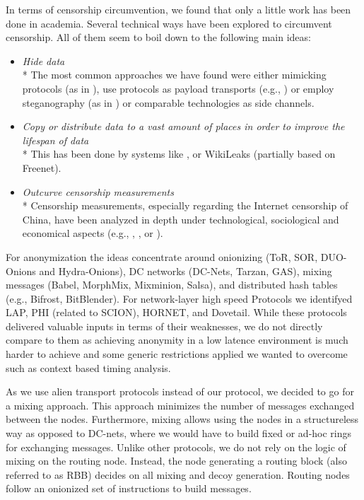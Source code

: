 \documentclass[acmsmall, screen, final]{acmart}
\begin{document}
	In terms of censorship circumvention, we found that only a little work has been done in academia. Several technical ways have been explored to circumvent censorship. All of them seem to boil down to the following main ideas:
	\begin{itemize}
		\item \emph{Hide data}\\*
		The most common approaches we have found were either mimicking protocols (as in \cite{mohajeri2013skypemorph}), use protocols as payload transports (e.g., \cite{AthanRAM07}) or employ steganography (as in \cite{f5}) or comparable technologies as side channels.
		\item \emph{Copy or distribute data to a vast amount of places in order to improve the lifespan of data}\\*
		This has been done by systems like \cite{freenet}, or WikiLeaks (partially based on Freenet).
		\item \emph{Outcurve censorship measurements}\\*
		Censorship measurements, especially regarding the Internet censorship of China, have been analyzed in depth under technological, sociological and economical aspects (e.g., \cite{Ensafi:2015}, \cite{Clayton:2006}, or \cite{lowe2007great}).
	\end{itemize}
	
	For anonymization the ideas concentrate around onionizing (ToR\cite{tor-spec}, SOR\cite{Egners_2012}, DUO-Onions and Hydra-Onions\cite{iwanik2005duo}), DC networks (DC-Nets\cite{chaum-dc}, Tarzan\cite{tarzan:ccs02}, GAS\cite{AthanRAM07}), mixing messages (Ba\-bel\cite{babel}, Morph\-Mix\cite{morphmix:wpes2002}, Mixminion\cite{minion-design}, Salsa\cite{Salsa}), and distributed hash tables (e.g., Bi\-frost\cite{Kondo2009}, Bit\-Blen\-der\cite{Bauer:2008}). For network-layer high speed Protocols we identifyed LAP\cite{hsiao2012lap}, PHI (related to SCI\-ON\cite{perrig2017scion}), HOR\-NET\cite{chen2015hornet}, and Dovetail\cite{chen2015hornet}. While these protocols delivered valuable inputs in terms of their weaknesses, we do not directly compare to them as achieving anonymity in a low latence environment is much harder to achieve and some generic restrictions applied we wanted to overcome such as context based timing analysis.
	
	As we use alien transport protocols instead of our protocol, we decided to go for a mixing approach. This approach minimizes the number of messages exchanged between the nodes. Furthermore, mixing allows using the nodes in a structureless way as opposed to DC-nets, where we would have to build fixed or ad-hoc rings for exchanging messages. Unlike other protocols, we do not rely on the logic of mixing on the routing node. Instead, the node generating a routing block (also referred to as RBB) decides on all mixing and decoy generation. Routing nodes follow an onionized set of instructions to build messages. 
	
\end{document}
